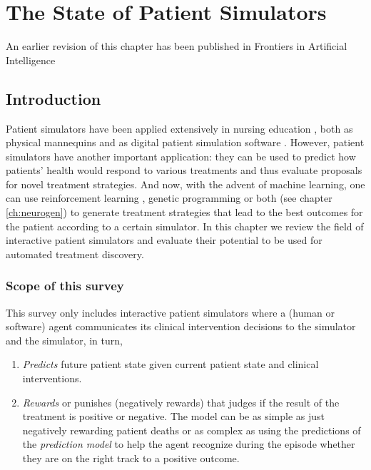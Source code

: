 \chapter{The State of Patient Simulators}
\label{ch:simulators-sota}

\begin{remark}
    An earlier revision of this chapter \cite[section 2]{liventsevEffectivePatientSimulators2021} has been published in Frontiers in Artificial Intelligence
\end{remark}

\section{Introduction}
\label{sec:intro}

Patient simulators have been applied extensively in nursing education \cite{didactic-sims1,didactic-sims2,didactic-sims3}, both as physical mannequins and as digital patient simulation software \cite{didactic-virtual}.
However, patient simulators have another important application: they can be used to predict how patients' health would respond to various treatments and thus evaluate proposals for novel treatment strategies.
And now, with the advent of machine learning, one can use reinforcement learning \cite{healthcare-rl}, genetic programming or both (see chapter \ref{ch:neurogen}) to generate treatment strategies that lead to the best outcomes for the patient according to a certain simulator.
In this chapter we review the field of interactive patient simulators and evaluate their potential to be used for automated treatment discovery.

\subsection{Scope of this survey}
\label{sec:scope}

This survey only includes interactive patient simulators where a (human or software) agent communicates its clinical intervention decisions to the simulator and the simulator, in turn,
\begin{enumerate}
    \item \emph{Predicts} future patient state given current patient state and clinical interventions.
    \item \emph{Rewards} or punishes (negatively rewards) that judges if the result of the treatment is positive or negative. The model can be as simple as just negatively rewarding patient deaths or as complex as using the predictions of the \emph{prediction model} to help the agent recognize during the episode whether they are on the right track to a positive outcome.
\end{enumerate}

